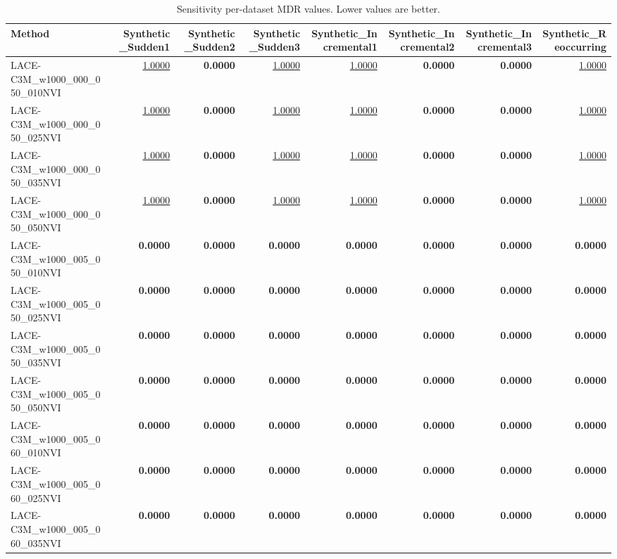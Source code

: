 \begin{table}
\caption{Sensitivity per-dataset MDR values. Lower values are better.}
\label{tab:per-data-sensitivity-missed-detection-rate}
\begin{tabular}{lrrrrrrr}
\toprule
Method & Synthetic\_Sudden1 & Synthetic\_Sudden2 & Synthetic\_Sudden3 & Synthetic\_Incremental1 & Synthetic\_Incremental2 & Synthetic\_Incremental3 & Synthetic\_Reoccurring \\
\midrule
LACE-C3M\_w1000\_000\_050\_010NVI & \underline{1.0000} & \textbf{0.0000} & \underline{1.0000} & \underline{1.0000} & \textbf{0.0000} & \textbf{0.0000} & \underline{1.0000} \\
LACE-C3M\_w1000\_000\_050\_025NVI & \underline{1.0000} & \textbf{0.0000} & \underline{1.0000} & \underline{1.0000} & \textbf{0.0000} & \textbf{0.0000} & \underline{1.0000} \\
LACE-C3M\_w1000\_000\_050\_035NVI & \underline{1.0000} & \textbf{0.0000} & \underline{1.0000} & \underline{1.0000} & \textbf{0.0000} & \textbf{0.0000} & \underline{1.0000} \\
LACE-C3M\_w1000\_000\_050\_050NVI & \underline{1.0000} & \textbf{0.0000} & \underline{1.0000} & \underline{1.0000} & \textbf{0.0000} & \textbf{0.0000} & \underline{1.0000} \\
LACE-C3M\_w1000\_005\_050\_010NVI & \textbf{0.0000} & \textbf{0.0000} & \textbf{0.0000} & \textbf{0.0000} & \textbf{0.0000} & \textbf{0.0000} & \textbf{0.0000} \\
LACE-C3M\_w1000\_005\_050\_025NVI & \textbf{0.0000} & \textbf{0.0000} & \textbf{0.0000} & \textbf{0.0000} & \textbf{0.0000} & \textbf{0.0000} & \textbf{0.0000} \\
LACE-C3M\_w1000\_005\_050\_035NVI & \textbf{0.0000} & \textbf{0.0000} & \textbf{0.0000} & \textbf{0.0000} & \textbf{0.0000} & \textbf{0.0000} & \textbf{0.0000} \\
LACE-C3M\_w1000\_005\_050\_050NVI & \textbf{0.0000} & \textbf{0.0000} & \textbf{0.0000} & \textbf{0.0000} & \textbf{0.0000} & \textbf{0.0000} & \textbf{0.0000} \\
LACE-C3M\_w1000\_005\_060\_010NVI & \textbf{0.0000} & \textbf{0.0000} & \textbf{0.0000} & \textbf{0.0000} & \textbf{0.0000} & \textbf{0.0000} & \textbf{0.0000} \\
LACE-C3M\_w1000\_005\_060\_025NVI & \textbf{0.0000} & \textbf{0.0000} & \textbf{0.0000} & \textbf{0.0000} & \textbf{0.0000} & \textbf{0.0000} & \textbf{0.0000} \\
LACE-C3M\_w1000\_005\_060\_035NVI & \textbf{0.0000} & \textbf{0.0000} & \textbf{0.0000} & \textbf{0.0000} & \textbf{0.0000} & \textbf{0.0000} & \textbf{0.0000} \\

\end{tabular}
\end{table}
